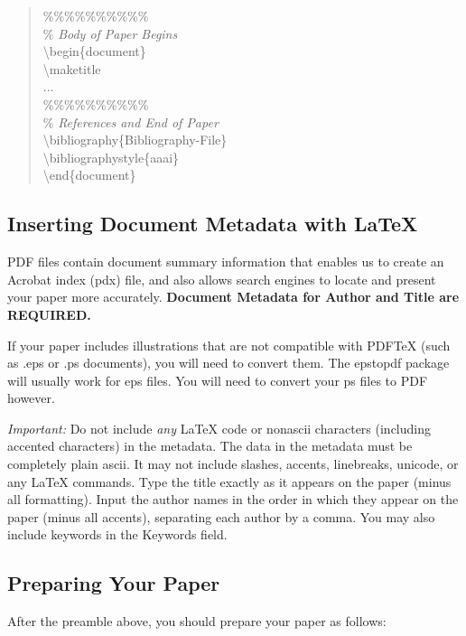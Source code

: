 \documentclass[letterpaper]{article}
\begin{document}
\begin{quote}
\begin{small}
    \%\%\%\%\%\%\%\%\%\%\\
    \% \textit{Body of Paper Begins}\\
    \textbackslash begin\{document\}\\
    \textbackslash maketitle\\
    ...\\
    \%\%\%\%\%\%\%\%\%\%\\
    \% \textit{References and End of Paper}\\
    \textbackslash bibliography\{Bibliography-File\}\\
    \textbackslash bibliographystyle\{aaai\}\\
    \textbackslash end\{document\}
  \end{small}
\end{quote}

\subsection{Inserting Document Metadata with \LaTeX{}}
PDF files contain document summary information that enables us to create an Acrobat index (pdx) file, and also allows search engines to locate and present your paper more accurately. \textbf{Document Metadata  for Author and Title are REQUIRED.}

If your paper includes illustrations that are not compatible with PDF\TeX{} (such as .eps or .ps documents), you will need to convert them. The epstopdf package will usually work for eps files. You will need to convert your ps files to PDF however.

\textit{Important:} Do not include \textit{any} \LaTeX{} code or nonascii characters (including accented characters) in the metadata. The data in the metadata must be completely plain ascii. It may not include slashes, accents, linebreaks, unicode, or any \LaTeX{} commands. Type the title exactly as it appears on the paper (minus all formatting). Input the author names in the order in which they appear on the paper (minus all accents), separating each author by a comma. You may also include keywords in the Keywords field.



\subsection{Preparing Your Paper}

After the preamble above, you should prepare your paper as follows:
\end{document}
